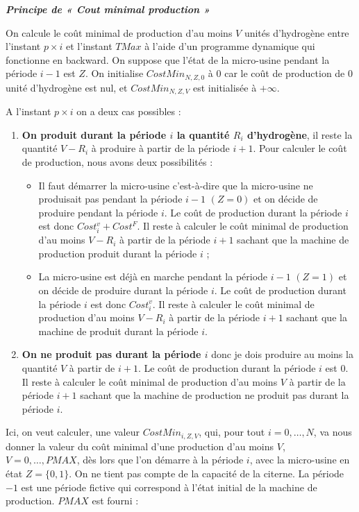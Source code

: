 

\textit{ \textbf{Principe de « Cout minimal production »}}

On calcule le coût minimal de production d'au moins $V$ unités d'hydrogène
entre l'instant $p\times i$ et l'instant $TMax$ à l'aide d'un programme dynamique qui fonctionne en backward. On suppose que l'état de la micro-usine pendant la période $i-1$ est $Z$.
On initialise $CostMin_{N,Z,0}$ à $ 0$ car le coût de production de 0 unité d'hydrogène est nul, et $CostMin_{N,Z,V}$ est initialisée à $+\infty$.

A l'instant $p\times i$ on a deux cas possibles :
\begin{enumerate}
	\item \textbf{On produit durant la période $i$ la quantité $R_{i}$ d'hydrogène}, il reste la quantité $V-R_{i}$ à produire à partir de la période $i+1$. Pour calculer le coût de production, nous avons deux possibilités :
	\begin{itemize}[label=$\square$]
		\item Il faut démarrer la micro-usine c'est-à-dire que la micro-usine ne produisait pas pendant la période $i-1$ $(Z=0)$ et on décide de produire pendant la période $i$. Le coût de production durant la période $i$ est donc $Cost^v_i+Cost^F$. Il reste à calculer le coût minimal de production d'au moins $V-R_{i}$ à partir de la période $i+1$ sachant que la machine de production produit durant la période $i$ ;
		
		\item La micro-usine est déjà en marche pendant la période $i-1$ $(Z=1)$ et on décide de produire durant la période $ i$. Le coût de production durant la période $i$ est donc $Cost^v_i$. Il reste à calculer le coût minimal de production d'au moins $V-R_{i}$ à partir de la période $i+1$ sachant que la machine de produit durant la période $i$.
	\end{itemize}
	\item \textbf{On ne produit pas durant la période $i$} donc je dois produire au moins la quantité $V$ à partir de $i+1$. Le coût de production durant la période $i$ est 0. Il reste à calculer le coût minimal de production d'au moins $V$ à partir de la période $i+1$ sachant que la machine de production ne produit pas durant la période $i$.
\end{enumerate}
Ici, on veut calculer, une valeur $CostMin_{i,Z,V}$, qui, pour tout $i=0, \dots, N$, va nous donner la valeur du coût minimal d'une production d'au moins $V$, $V=0, \dots, PMAX$, dès lors que l'on démarre à la période $i$, avec la micro-usine en état $Z=\{0,1\}$. On ne tient pas compte de la capacité de la citerne. La période $-1$ est une période fictive qui correspond à l'état initial de la machine de production. $PMAX$ est fourni :
